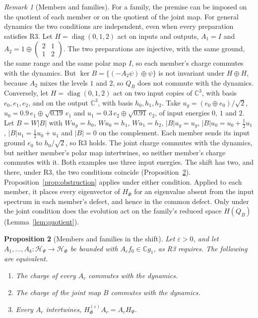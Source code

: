\documentclass[11pt]{article}
\newtheorem{proposition}{Proposition}
\theoremstyle{remark}
\newtheorem{remark}[proposition]{Remark}
\newcommand{\C}{\mathbb C}
\newcommand{\HP}{\mathcal H_\Psi}
\newcommand{\HF}{\mathcal H_\Phi}
\begin{document}
\begin{remark}[Members and families]\label{rem:members}
For a family, the premise can be imposed on the quotient of each member or on the quotient of the joint map. For general dynamics the two conditions are independent, even when every preparation satisfies R3. Let $H=\operatorname{diag}(0,1,2)$ act on inputs and outputs, $A_1=I$ and $A_2=1\oplus\left(\begin{smallmatrix}2&1\\1&2\end{smallmatrix}\right)$. The two preparations are injective, with the same ground, the same range and the same polar map $I$, so each member's charge commutes with the dynamics. But $\ker B=\{(-A_2\psi)\oplus\psi\}$ is not invariant under $H\oplus H$, because $A_2$ mixes the levels $1$ and $2$, so $Q_B$ does not commute with the dynamics. Conversely, let $H=\operatorname{diag}(0,1,2)$ act on two input copies of $\C^3$, with basis $e_0,e_1,e_2$, and on the output $\C^3$, with basis $h_0,h_1,h_2$. Take $u_g=(e_0\oplus e_0)/\sqrt2$, $u_0=0.9\,e_1\oplus\sqrt{0.19}\,e_1$ and $u_1=0.3\,e_2\oplus\sqrt{0.91}\,e_2$, of input energies $0$, $1$ and $2$. Let $B=W|B|$ with $Wu_g=h_0$, $Wu_0=h_1$, $Wu_1=h_2$, $|B|u_g=u_g$, $|B|u_0=u_0+\tfrac12u_1$, $|B|u_1=\tfrac12u_0+u_1$ and $|B|=0$ on the complement. Each member sends its input ground $e_0$ to $h_0/\sqrt2$, so R3 holds. The joint charge commutes with the dynamics, but neither member's polar map intertwines, so neither member's charge commutes with it. Both examples use three input energies. The shift has two, and there, under R3, the two conditions coincide (Proposition~\ref{prop:shift-equivalence}). Proposition~\ref{prop:obstruction} applies under either condition. Applied to each member, it places every eigenvector of $H_\Phi$ for an eigenvalue absent from the input spectrum in each member's defect, and hence in the common defect. Only under the joint condition does the evolution act on the family's reduced space $H(Q_B)$ (Lemma~\ref{lem:quotient}).
\end{remark}

\begin{proposition}[Members and families in the shift]\label{prop:shift-equivalence}
Let $\varepsilon>0$, and let $A_1,\dots,A_k:\HP\to\HF$ be bounded with $A_cf_0\in\C g_1$, as R3 requires. The following are equivalent.
\begin{enumerate}
\item[(a)] The charge of every $A_c$ commutes with the dynamics.
\item[(b)] The charge of the joint map $B$ commutes with the dynamics.
\item[(c)] Every $A_c$ intertwines, $H_\Phi^{(\varepsilon)}A_c=A_cH_\Psi$.
\end{enumerate}
\end{proposition}
\end{document}
